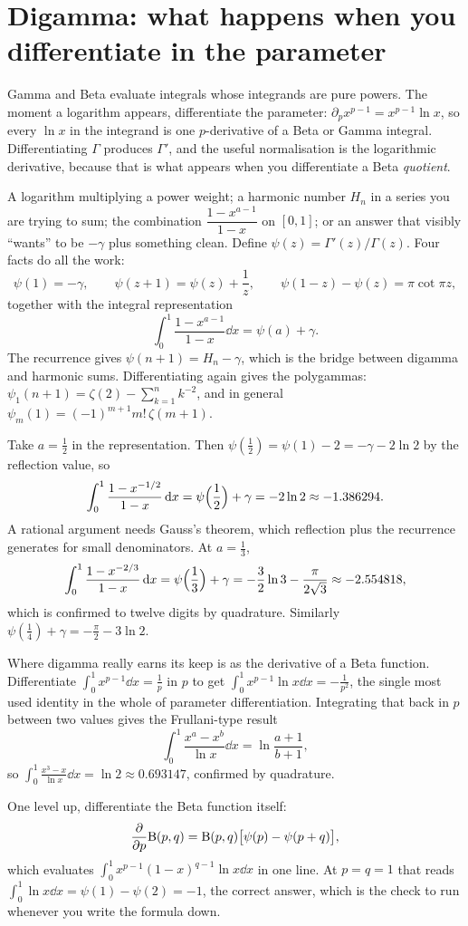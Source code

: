 \section{Digamma: what happens when you differentiate in the parameter}

Gamma and Beta evaluate integrals whose integrands are pure powers. The moment a logarithm appears, differentiate the parameter: $\partial_p x^{p-1}=x^{p-1}\ln x$, so every $\ln x$ in the integrand is one $p$-derivative of a Beta or Gamma integral. Differentiating $\Gamma$ produces $\Gamma'$, and the useful normalisation is the logarithmic derivative, because that is what appears when you differentiate a Beta \emph{quotient}.

\cue A logarithm multiplying a power weight; a harmonic number $H_n$ in a series you are trying to sum; the combination $\dfrac{1-x^{a-1}}{1-x}$ on $[0,1]$; or an answer that visibly ``wants'' to be $-\gamma$ plus something clean.
\method Define $\psi(z)=\Gamma'(z)/\Gamma(z)$. Four facts do all the work:
\[\psi(1)=-\gamma,\qquad \psi(z+1)=\psi(z)+\frac1z,\qquad \psi(1-z)-\psi(z)=\pi\cot\pi z,\]
together with the integral representation
\[\int_0^1\frac{1-x^{a-1}}{1-x}\dd x=\psi(a)+\gamma.\]
The recurrence gives $\psi(n+1)=H_n-\gamma$, which is the bridge between digamma and harmonic sums. Differentiating again gives the polygammas: $\psi_1(n+1)=\zeta(2)-\sum_{k=1}^{n}k^{-2}$, and in general $\psi_m(1)=(-1)^{m+1}m!\,\zeta(m+1)$.

\begin{worked}
Take $a=\tfrac12$ in the representation. Then $\psi(\tfrac12)=\psi(1)-2=-\gamma-2\ln2$ by the reflection value, so
\[\int_0^1\frac{1-x^{-1/2}}{1-x}\,\mathrm{d} x=\psi\Bigl(\frac12\Bigr)+\gamma=-2\ln2\approx-1.386294.\]
A rational argument needs Gauss's theorem, which reflection plus the recurrence generates for small denominators. At $a=\tfrac13$,
\[\int_0^1\frac{1-x^{-2/3}}{1-x}\,\mathrm{d} x=\psi\Bigl(\frac13\Bigr)+\gamma=-\frac{3}{2}\ln3-\frac{\pi}{2\sqrt3}\approx-2.554818,\]
which is confirmed to twelve digits by quadrature. Similarly $\psi(\tfrac14)+\gamma=-\tfrac{\pi}{2}-3\ln2$.
\end{worked}

\begin{worked}
Where digamma really earns its keep is as the derivative of a Beta function. Differentiate
$\int_0^1x^{p-1}\dd x=\tfrac1p$ in $p$ to get $\int_0^1x^{p-1}\ln x\dd x=-\tfrac{1}{p^{2}}$, the single most used identity in the whole of parameter differentiation. Integrating that back in $p$ between two values gives the Frullani-type result
\[\int_0^1\frac{x^{a}-x^{b}}{\ln x}\dd x=\ln\frac{a+1}{b+1},\]
so $\int_0^1\frac{x^{3}-x}{\ln x}\dd x=\ln2\approx0.693147$, confirmed by quadrature.

One level up, differentiate the Beta function itself:
\[\frac{\partial }{\partial p}\mathrm{B}(p,q)=\mathrm{B}(p,q)\bigl[\psi(p)-\psi(p+q)\bigr],\]
which evaluates $\int_0^1x^{p-1}(1-x)^{q-1}\ln x\dd x$ in one line. At $p=q=1$ that reads $\int_0^1\ln x\dd x=\psi(1)-\psi(2)=-1$, the correct answer, which is the check to run whenever you write the formula down.
\end{worked}

